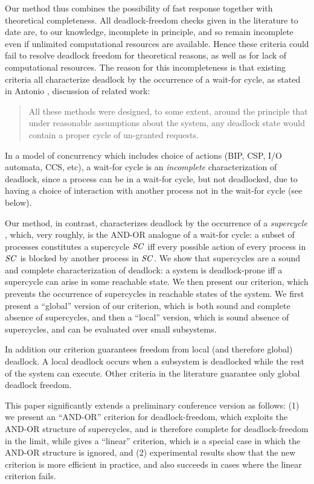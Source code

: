 Our method thus combines the possibility of fast response together with theoretical completeness.
All deadlock-freedom checks given in the literature to date are, to our knowledge, incomplete in
principle, and so remain incomplete even if unlimited computational resources are available.
Hence these criteria could fail to resolve deadlock freedom for theoretical reasons, as well as for 
lack of computational resources.
%
The reason for this incompleteness is that existing criteria all characterize deadlock by the
occurrence of a wait-for cycle, \eg as stated in Antonio \etal \cite{AGR16}, discussion of related
work:
\begin{quote}
All these methods were designed, to some extent, around the principle that under reasonable
assumptions about the system, any deadlock state would contain a proper cycle of un-granted requests.
\end{quote}
In a model of concurrency which includes choice of actions
(\eg BIP, CSP, I/O automata, CCS, etc), a wait-for cycle is an \emph{incomplete} characterization of
deadlock, since a process can be in a wait-for cycle, but not deadlocked, due to having a choice of
interaction with another process not in the wait-for cycle (see  below).

Our method, in contrast, characterizes deadlock by the occurrence of a \emph{supercycle} \cite{AE98,AC05}, which, very roughly, is the AND-OR analogue
of a wait-for cycle: a subset of processes constitutes a supercycle $\mathit{SC}$ iff every possible action of every process in $\mathit{SC}$ is blocked by another
process in $\mathit{SC}$.
%
We show that supercycles are a sound and complete characterization of deadlock: a system is deadlock-prone iff a supercycle can arise in some
reachable state.
%
We then present our criterion, which prevents the occurrence of supercycles in reachable states of
the system. We first present a ``global'' version of our criterion, which is both sound and complete
\wrt absence of supercycles, and then a ``local'' version, which is sound \wrt absence of
supercycles, and can be evaluated over small subsystems.

In addition our criterion guarantees freedom from local (and therefore global) deadlock. A local deadlock occurs when 
a subsystem is deadlocked while the rest of the system can execute. Other criteria in the literature \cite{AGR16,Ma96,RD87,DFinder2,BR91,MM12,GS03,AB03} guarantee only global deadlock freedom.

This paper significantly extends a preliminary conference version \cite{FORTE13} as
follows: 
(1) we present an ``AND-OR'' criterion for deadlock-freedom, which exploits the AND-OR structure of supercycles, and is therefore complete for
deadlock-freedom in the limit, while \cite{FORTE13} gives a ``linear'' criterion, which is a special case in which the AND-OR structure is ignored, and
(2) experimental results show that the new criterion is more efficient in practice, and also succeeds in cases where the linear criterion fails.

